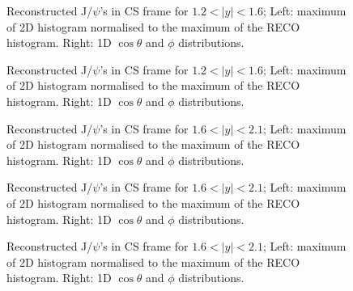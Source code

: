 \documentclass[12pt]{article}
\newcommand{\jpsi}{J/$\psi$}
\begin{document}
\begin{figure}[htbp]
\centering
{}
\caption{Reconstructed \jpsi's in CS frame for $1.2 < |y| < 1.6$; Left: maximum of 2D histogram normalised to the maximum of the RECO histogram. Right: 1D $\cos\theta$ and $\phi$ distributions.}
\label{fig:trackerMuonsVsEta}
\end{figure} \clearpage 

\begin{figure}[htbp]
\centering
{}
\caption{Reconstructed \jpsi's in CS frame for $1.2 < |y| < 1.6$; Left: maximum of 2D histogram normalised to the maximum of the RECO histogram. Right: 1D $\cos\theta$ and $\phi$ distributions.}
\label{fig:trackerMuonsVsEta}
\end{figure} \clearpage 

\begin{figure}[htbp]
\centering
{}
\caption{Reconstructed \jpsi's in CS frame for $1.6 < |y| < 2.1$; Left: maximum of 2D histogram normalised to the maximum of the RECO histogram. Right: 1D $\cos\theta$ and $\phi$ distributions.}
\label{fig:trackerMuonsVsEta}
\end{figure} \clearpage 

\begin{figure}[htbp]
\centering
{}
\caption{Reconstructed \jpsi's in CS frame for $1.6 < |y| < 2.1$; Left: maximum of 2D histogram normalised to the maximum of the RECO histogram. Right: 1D $\cos\theta$ and $\phi$ distributions.}
\label{fig:trackerMuonsVsEta}
\end{figure} \clearpage 

\begin{figure}[htbp]
\centering
{}
\caption{Reconstructed \jpsi's in CS frame for $1.6 < |y| < 2.1$; Left: maximum of 2D histogram normalised to the maximum of the RECO histogram. Right: 1D $\cos\theta$ and $\phi$ distributions.}
\label{fig:trackerMuonsVsEta}
\end{figure} \clearpage 
\end{document}
